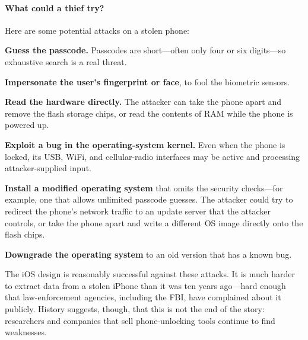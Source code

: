 \paragraph{What could a thief try?}
Here are some potential attacks on a stolen phone:
\begin{compactitem}
  \item \textbf{Guess the passcode.}
        Passcodes are short---often only four or six digits---so
        exhaustive search is a real threat.
  \item \textbf{Impersonate the user's fingerprint or face}, to fool the
        biometric sensors.
  \item \textbf{Read the hardware directly.}
        The attacker can take the phone apart and remove the flash storage
        chips, or read the contents of RAM while the phone is powered up.
  \item \textbf{Exploit a bug in the operating-system kernel.}
        Even when the phone is locked, its USB, WiFi, and cellular-radio
        interfaces may be active and processing attacker-supplied input.
  \item \textbf{Install a modified operating system} that omits the
        security checks---for example, one that allows unlimited passcode
        guesses.
        The attacker could try to redirect the phone's network traffic to
        an update server that the attacker controls, or take the phone apart
        and write a different OS image directly onto the flash chips.
  \item \textbf{Downgrade the operating system} to an old version that
        has a known bug.
\end{compactitem}

The iOS design is reasonably successful against these attacks.
It is much harder to extract data from a stolen iPhone than it was ten
years ago---hard enough that law-enforcement agencies, including the FBI,
have complained about it publicly.
History suggests, though, that this is not the end of the story:
researchers and companies that sell phone-unlocking tools continue to
find weaknesses.

